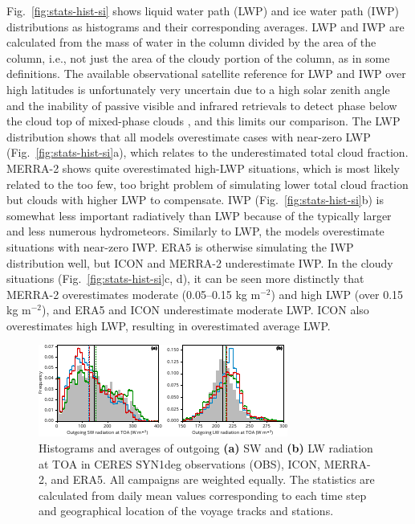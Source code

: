 \documentclass[draft]{agujournal2019}
\begin{document}
Fig.~\ref{fig:stats-hist-si} shows liquid water path (LWP) and ice water path (IWP) distributions as histograms and their corresponding averages. LWP and IWP are calculated from the mass of water in the column divided by the area of the column, i.e., not just the area of the cloudy portion of the column, as in some definitions. The available observational satellite reference for LWP and IWP over high latitudes is unfortunately very uncertain due to a high solar zenith angle and the inability of passive visible and infrared retrievals to detect phase below the cloud top of mixed-phase clouds \cite{huang2006,greenwald2009,seethala2010,eliasson2011,duncan2018,khanal2020}, and this limits our comparison. The LWP distribution shows that all models overestimate cases with near-zero LWP (Fig.~\ref{fig:stats-hist-si}a), which relates to the underestimated total cloud fraction. MERRA-2 shows quite overestimated high-LWP situations, which is most likely related to the too few, too bright problem of simulating lower total cloud fraction but clouds with higher LWP to compensate. IWP (Fig.~\ref{fig:stats-hist-si}b) is somewhat less important radiatively than LWP because of the typically larger and less numerous hydrometeors. Similarly to LWP, the models overestimate situations with near-zero IWP. ERA5 is otherwise simulating the IWP distribution well, but ICON and MERRA-2 underestimate IWP. In the cloudy situations (Fig.~\ref{fig:stats-hist-si}c, d), it can be seen more distinctly that MERRA-2 overestimates moderate (0.05--0.15 kg m$^{-2}$) and high LWP (over 0.15 kg m$^{-2}$), and ERA5 and ICON underestimate moderate LWP. ICON also overestimates high LWP, resulting in overestimated average LWP.

\begin{figure}[t]
\centering
\includegraphics[width=\textwidth]{img/stats_hist_rad.pdf}
\caption{
Histograms and averages of outgoing \textbf{(a)} SW and \textbf{(b)} LW radiation at TOA in CERES SYN1deg observations (OBS), ICON, MERRA-2, and ERA5. All campaigns are weighted equally. The statistics are calculated from daily mean values corresponding to each time step and geographical location of the voyage tracks and stations.
}
\label{fig:stats-hist-rad}
\end{figure}
\end{document}
